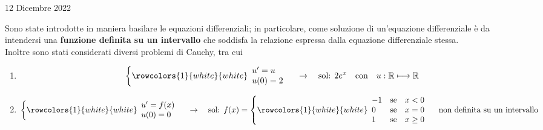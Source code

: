 \documentclass[a4paper]{extarticle}
\begin{document}
\newpage
\noindent
\begin{center}
    12 Dicembre 2022
\end{center}
Sono state introdotte in maniera basilare le equazioni differenziali; in particolare, come soluzione di un'equazione differenziale è da intendersi una \textbf{funzione definita su un intervallo} che soddisfa la relazione espressa dalla equazione differenziale stessa.\\
Inoltre sono stati considerati diversi problemi di Cauchy, tra cui
\begin{enumerate}
    \item \[\left\{
        \rowcolors{1}{white}{white}
        \begin{array}{lll}
            u'=u\\
            u(0)=2
        \end{array}
    \right. \hspace{1em} \rightarrow \hspace{1em} \text{sol: } 2e^x \hspace{1em} \text{con} \hspace{1em} u : \mathbb{R} \longmapsto \mathbb{R}\]

    \item \[\left\{
        \rowcolors{1}{white}{white}
        \begin{array}{lll}
            u'=f(x)\\
            u(0)=0
        \end{array}
    \right. \hspace{1em} \rightarrow \hspace{1em} \text{sol: } f(x)=\left\{
        \rowcolors{1}{white}{white}
        \begin{array}{lll}
            -1 & \text{se} & x < 0\\
            0 & \text{se} & x = 0\\
            1 & \text{se} & x \geq 0\\
        \end{array}
    \right. \hspace{1em} \text{non definita su un intervallo}\]


\end{enumerate}
\end{document}
